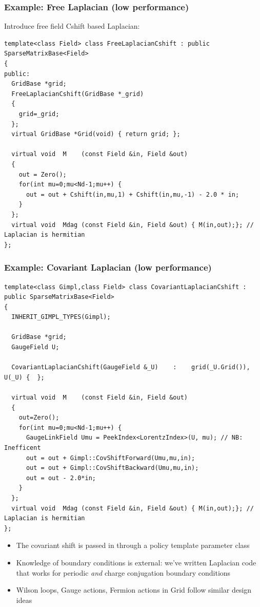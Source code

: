 \documentclass[pdf,ps,8pt]{beamer}
\begin{document}
\begin{frame}[fragile]\small\frametitle{ Example: Free Laplacian (low performance)}

Introduce free field Cshift based Laplacian:

{\tiny
\begin{verbatim}
template<class Field> class FreeLaplacianCshift : public SparseMatrixBase<Field>
{
public:
  GridBase *grid;
  FreeLaplacianCshift(GridBase *_grid)
  {
    grid=_grid;
  };
  virtual GridBase *Grid(void) { return grid; };

  virtual void  M    (const Field &in, Field &out)
  {
    out = Zero();
    for(int mu=0;mu<Nd-1;mu++) {
      out = out + Cshift(in,mu,1) + Cshift(in,mu,-1) - 2.0 * in;
    }
  };
  virtual void  Mdag (const Field &in, Field &out) { M(in,out);}; // Laplacian is hermitian
};
  \end{verbatim}
}
\end{frame}


\begin{frame}[fragile]\small\frametitle{ Example: Covariant Laplacian (low performance)}


{\tiny
\begin{verbatim}
template<class Gimpl,class Field> class CovariantLaplacianCshift : public SparseMatrixBase<Field>
{
  INHERIT_GIMPL_TYPES(Gimpl);

  GridBase *grid;
  GaugeField U;
  
  CovariantLaplacianCshift(GaugeField &_U)    :    grid(_U.Grid()),    U(_U) {  };

  virtual void  M    (const Field &in, Field &out)
  {
    out=Zero();
    for(int mu=0;mu<Nd-1;mu++) {
      GaugeLinkField Umu = PeekIndex<LorentzIndex>(U, mu); // NB: Inefficent
      out = out + Gimpl::CovShiftForward(Umu,mu,in);    
      out = out + Gimpl::CovShiftBackward(Umu,mu,in);    
      out = out - 2.0*in;
    }
  };
  virtual void  Mdag (const Field &in, Field &out) { M(in,out);}; // Laplacian is hermitian
};
  \end{verbatim}
}
\begin{itemize}
\item The covariant shift is passed in through a policy template parameter class
\item Knowledge of boundary conditions is external: we've written Laplacian code that works for periodic \emph{and} charge conjugation boundary conditions
\item Wilson loops, Gauge actions, Fermion actions in Grid follow similar design ideas
\end{itemize}
\end{frame}
\end{document}
